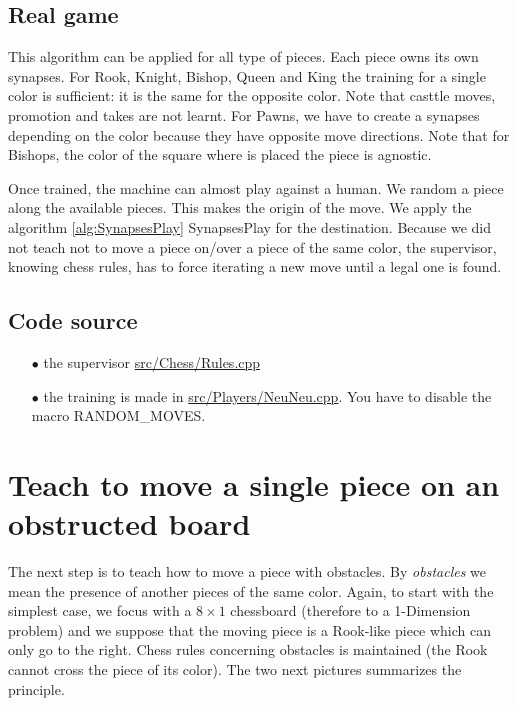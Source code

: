 \documentclass[a4paper,10pt]{article}
\begin{document}
\subsection{Real game}

This algorithm can be applied for all type of pieces. Each piece owns its own
synapses. For Rook, Knight, Bishop, Queen and King the training for a single
color is sufficient: it is the same for the opposite color. Note that casttle
moves, promotion and takes are not learnt. For Pawns, we have to create a
synapses depending on the color because they have opposite move directions. Note
that for Bishops, the color of the square where is placed the piece is agnostic.

Once trained, the machine can almost play against a human. We random a piece
along the available pieces. This makes the origin of the move. We apply the
algorithm \ref{alg:SynapsesPlay} SynapsesPlay for the destination. Because we
did not teach not to move a piece on/over a piece of the same color, the
supervisor, knowing chess rules, has to force iterating a new move until a legal
one is found.

\subsection{Code source}

\begin{itemize}
\item[$\bullet$] the supervisor
\href{https://github.com/Lecrapouille/ChessNeuNeu/blob/master/src/Chess/Rules.cpp}{src/Chess/Rules.cpp}
\item[$\bullet$] the training is made in \href{https://github.com/Lecrapouille/ChessNeuNeu/blob/master/src/Players/NeuNeu.cpp}{src/Players/NeuNeu.cpp}.
  You have to disable the macro RANDOM\_MOVES.
\end{itemize}

\section{Teach to move a single piece on an obstructed board}

The next step is to teach how to move a piece with obstacles. By
\textit{obstacles} we mean the presence of another pieces of the same
color. Again, to start with the simplest case, we focus with a $8 \times 1$
chessboard (therefore to a 1-Dimension problem) and we suppose that the moving
piece is a Rook-like piece which can only go to the right. Chess rules
concerning obstacles is maintained (the Rook cannot cross the piece of its
color). The two next pictures summarizes the principle.
\end{document}
